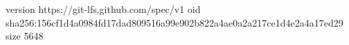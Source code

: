 version https://git-lfs.github.com/spec/v1
oid sha256:156cf1d4a0984fd17dad809516a99e902b822a4ae0a2a217ce1d4e2a4a17ed29
size 5648
